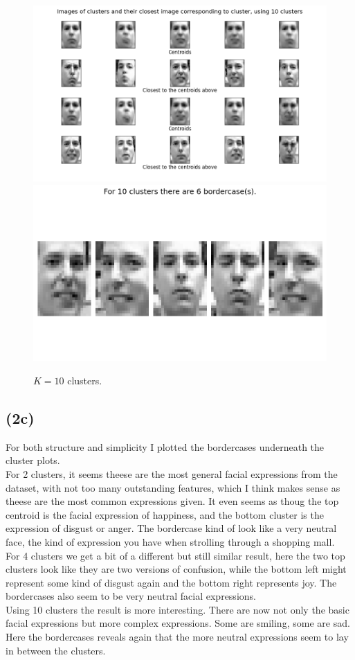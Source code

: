 \documentclass[12pt, letterpaper]{article}
\begin{document}
      \begin{figure}[H]
        \caption{$K = 10$ clusters.}
        \centering
        \includegraphics[scale=0.7]{cluster10}
        \includegraphics[scale=0.4]{border10}
      \end{figure}
    \subsection*{(2c)}
      For both structure and simplicity I plotted the bordercases underneath the cluster plots.\\
      For 2 clusters, it seems theese are the most general facial expressions from the dataset, with not too many outstanding features, which I think makes sense as theese are the most common expressions given. It even seems as thoug the top centroid is the facial expression of happiness, and the bottom cluster is the expression of disgust or anger. The bordercase kind of look like a very neutral face, the kind of expression you have when strolling through a shopping mall.\\
      For 4 clusters we get a bit of a different but still similar result, here the two top clusters look like they are two versions of confusion, while the bottom left might represent some kind of disgust again and the bottom right represents joy. The bordercases also seem to be very neutral facial expressions.\\
      Using 10 clusters the result is more interesting. There are now not only the basic facial expressions but more complex expressions. Some are smiling, some are sad. Here the bordercases reveals again that the more neutral expressions seem to lay in between the clusters.
\end{document}
